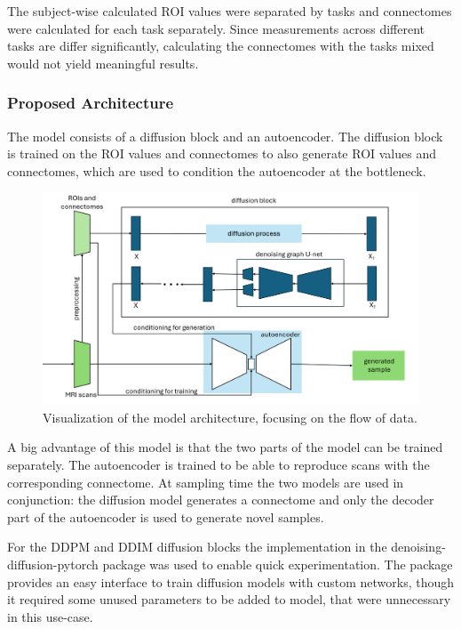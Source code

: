 	The subject-wise calculated ROI values were separated by tasks and connectomes were calculated for each task separately. Since measurements across different tasks are differ significantly, calculating the connectomes with the tasks mixed would not yield meaningful results.
	
	\subsubsection{Proposed Architecture}
	
	The model consists of a diffusion block and an autoencoder. The diffusion block is trained on the ROI values and connectomes to also generate ROI values and connectomes, which are used to condition the autoencoder at the bottleneck.
	
	\begin{figure}[!h]
		\centering
		\includegraphics[width=\textwidth]{figures/architecture.png}
		\caption{Visualization of the model architecture, focusing on the flow of data.}
	\end{figure}
	
	A big advantage of this model is that the two parts of the model can be trained separately. The autoencoder is trained to be able to reproduce scans with the corresponding connectome. At sampling time  the two models are used in conjunction: the diffusion model generates a connectome and only the decoder part of the autoencoder is used to generate novel samples.
	
	For the DDPM and DDIM diffusion blocks the implementation in the denoising-diffusion-pytorch package was used to enable quick experimentation. The package provides an easy interface to train diffusion models with custom networks, though it required some unused parameters to be added to model, that were unnecessary in this use-case.
	

